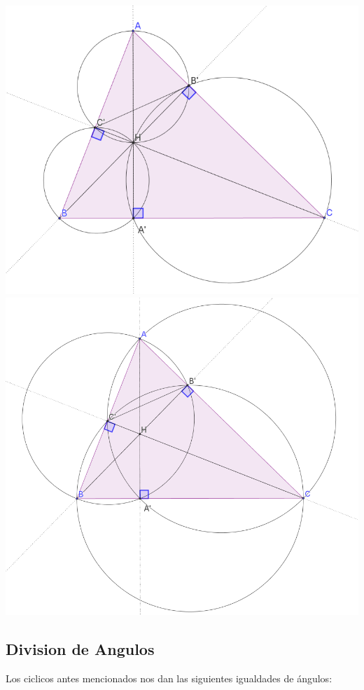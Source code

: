 \documentclass[11pt]{scrartcl}
\begin{document}
\begin{center}
    \includegraphics[scale=0.4]{PNAC2.png}
    \includegraphics[scale=0.4]{PNAC3.png}
\end{center}

\subsection{Division de Angulos}

Los ciclicos antes mencionados nos dan las siguientes igualdades de \'angulos:
\end{document}
